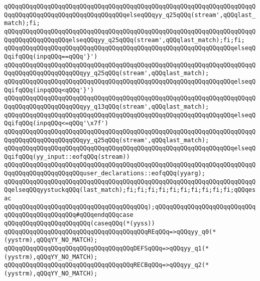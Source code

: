 \verb|qQQqqQQqqQQqqQQqqQQqqQQqqQQqqQQqqQQqqQQqqQQqqQQqqQQqqQQqqQQqqQQqqQQqqQQqqQQqqQQqqQQqqQQqqQQqqQQqqQQqqQQqelseqQQqyy_q25qQQq(stream',qQQqlast_match);fi;|\newline
\verb|qQQqqQQqqQQqqQQqqQQqqQQqqQQqqQQqqQQqqQQqqQQqqQQqqQQqqQQqqQQqqQQqqQQqqQQqqQQqqQQqqQQqqQQqelseqQQqyy_q25qQQq(stream',qQQqlast_match);fi;fi;|\newline
\verb|qQQqqQQqqQQqqQQqqQQqqQQqqQQqqQQqqQQqqQQqqQQqqQQqqQQqqQQqqQQqqQQqelseqQQqifqQQq(inpqQQq==qQQq'}')|\newline
\verb|qQQqqQQqqQQqqQQqqQQqqQQqqQQqqQQqqQQqqQQqqQQqqQQqqQQqqQQqqQQqqQQqqQQqqQQqqQQqqQQqqQQqqQQqqQQqyy_q25qQQq(stream',qQQqlast_match);|\newline
\verb|qQQqqQQqqQQqqQQqqQQqqQQqqQQqqQQqqQQqqQQqqQQqqQQqqQQqqQQqqQQqqQQqelseqQQqifqQQq(inpqQQq<qQQq'}')|\newline
\verb|qQQqqQQqqQQqqQQqqQQqqQQqqQQqqQQqqQQqqQQqqQQqqQQqqQQqqQQqqQQqqQQqqQQqqQQqqQQqqQQqqQQqqQQqqQQqyy_q13qQQq(stream',qQQqlast_match);|\newline
\verb|qQQqqQQqqQQqqQQqqQQqqQQqqQQqqQQqqQQqqQQqqQQqqQQqqQQqqQQqqQQqqQQqelseqQQqifqQQq(inpqQQq<=qQQq'\x7f')|\newline
\verb|qQQqqQQqqQQqqQQqqQQqqQQqqQQqqQQqqQQqqQQqqQQqqQQqqQQqqQQqqQQqqQQqqQQqqQQqqQQqqQQqqQQqqQQqqQQqyy_q25qQQq(stream',qQQqlast_match);|\newline
\verb|qQQqqQQqqQQqqQQqqQQqqQQqqQQqqQQqqQQqqQQqqQQqqQQqqQQqqQQqqQQqqQQqelseqQQqifqQQq(yy_input::eofqQQq(stream))|\newline
\verb|qQQqqQQqqQQqqQQqqQQqqQQqqQQqqQQqqQQqqQQqqQQqqQQqqQQqqQQqqQQqqQQqqQQqqQQqqQQqqQQqqQQqqQQqqQQquser_declarations::eofqQQq(yyarg);|\newline
\verb|qQQqqQQqqQQqqQQqqQQqqQQqqQQqqQQqqQQqqQQqqQQqqQQqqQQqqQQqqQQqqQQqqQQqqQQqelseqQQqyystuckqQQq(last_match);fi;fi;fi;fi;fi;fi;fi;fi;fi;fi;qQQqesac|\newline
\verb|qQQqqQQqqQQqqQQqqQQqqQQqqQQqqQQqqQQqqQQq);qQQqqQQqqQQqqQQqqQQqqQQqqQQqqQQqqQQqqQQqqQQqqQQq#qQQqendqQQqcase|\newline
\newline
\verb|qQQqqQQqqQQqqQQqqQQqqQQq(caseqQQq(*(yyss))|\newline
\verb|qQQqqQQqqQQqqQQqqQQqqQQqqQQqqQQqqQQqqQQqREqQQq=>qQQqyy_q0(*(yystrm),qQQqYY_NO_MATCH);|\newline
\verb|qQQqqQQqqQQqqQQqqQQqqQQqqQQqqQQqqQQqDEFSqQQq=>qQQqyy_q1(*(yystrm),qQQqYY_NO_MATCH);|\newline
\verb|qQQqqQQqqQQqqQQqqQQqqQQqqQQqqQQqqQQqRECBqQQq=>qQQqyy_q2(*(yystrm),qQQqYY_NO_MATCH);|\newline
